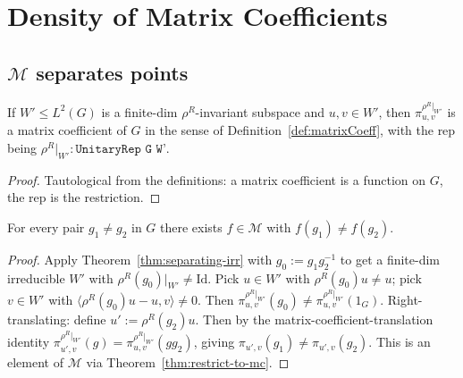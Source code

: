 \chapter{Density of Matrix Coefficients}
\label{chap:density}

\section{$\mathcal M$ separates points}

\begin{theorem}
  \label{thm:restrict-to-mc}
  \leanok
  If $W' \leq L^2(G)$ is a finite-dim $\rho^R$-invariant subspace and
  $u, v \in W'$, then
  $\pi_{u, v}^{\rho^R|_{W'}}$ is a matrix coefficient of $G$ in the
  sense of Definition~\ref{def:matrixCoeff}, with the rep being
  $\rho^R|_{W'} : \texttt{UnitaryRep G W'}$.
\end{theorem}

\begin{proof}
  Tautological from the definitions: a matrix coefficient is a function
  on $G$, the rep is the restriction.
\end{proof}

\begin{theorem}
  \label{thm:MCSet-separates}
  \leanok
  For every pair $g_1 \neq g_2$ in $G$ there exists
  $f \in \mathcal M$ with $f(g_1) \neq f(g_2)$.
\end{theorem}

\begin{proof}
  Apply Theorem~\ref{thm:separating-irr} with $g_0 := g_1 g_2^{-1}$
  to get a finite-dim irreducible $W'$ with $\rho^R(g_0)|_{W'} \neq \mathrm{Id}$.
  Pick $u \in W'$ with $\rho^R(g_0) u \neq u$; pick $v \in W'$
  with $\langle\rho^R(g_0) u - u, v\rangle \neq 0$.
  Then $\pi_{u, v}^{\rho^R|_{W'}}(g_0) \neq \pi_{u,v}^{\rho^R|_{W'}}(1_G)$.
  Right-translating: define $u' := \rho^R(g_2) u$. Then by the
  matrix-coefficient-translation identity
  $\pi_{u', v}^{\rho^R|_{W'}}(g) = \pi_{u, v}^{\rho^R|_{W'}}(g g_2)$,
  giving $\pi_{u', v}(g_1) \neq \pi_{u', v}(g_2)$.
  This is an element of $\mathcal M$ via Theorem~\ref{thm:restrict-to-mc}.
\end{proof}

